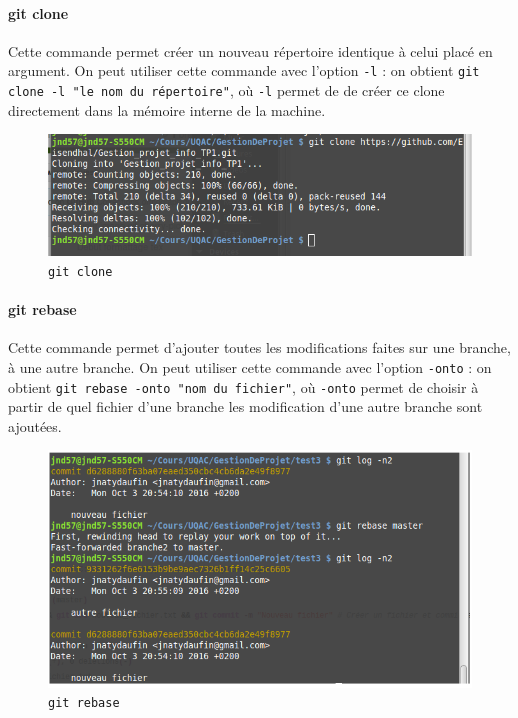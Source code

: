 \documentclass[11pt,canadien]{article}
\begin{document}
\paragraph{git clone}Cette commande permet créer un nouveau répertoire identique à celui placé en argument. On peut utiliser cette commande avec l’option \texttt{-l} : on obtient \texttt{git clone -l "le nom du répertoire"}, où \texttt{-l} permet de de créer ce clone directement dans la mémoire interne de la machine.
\begin{figure}
	\centering
	\includegraphics[width=\textwidth]{images/git-clone.png}
	\caption{\texttt{git clone}}
	\label{fig:git_clone}
\end{figure}

\paragraph{git rebase}Cette commande permet d'ajouter toutes les modifications faites sur une branche, à une autre branche. On peut utiliser cette commande avec l'option \texttt{-onto} : on obtient \texttt{git rebase -onto "nom du fichier"}, où \texttt{-onto} permet de choisir à partir de quel fichier d'une branche les modification d'une autre branche sont ajoutées.
\begin{figure}
	\centering
	\includegraphics[width=\textwidth]{images/git-rebase.png}
	\caption{\texttt{git rebase}}
	\label{fig:git_rebase}
\end{figure}
\end{document}
